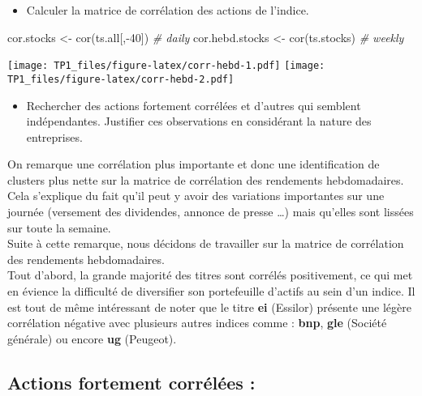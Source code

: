 \documentclass[
]{article}
\newenvironment{Shaded}{\begin{snugshade}}{\end{snugshade}}
\newcommand{\CommentTok}[1]{\textcolor[rgb]{0.56,0.35,0.01}{\textit{#1}}}
\newcommand{\DecValTok}[1]{\textcolor[rgb]{0.00,0.00,0.81}{#1}}
\newcommand{\FunctionTok}[1]{\textcolor[rgb]{0.00,0.00,0.00}{#1}}
\newcommand{\NormalTok}[1]{#1}
\newcommand{\OtherTok}[1]{\textcolor[rgb]{0.56,0.35,0.01}{#1}}
\newcommand{\SpecialCharTok}[1]{\textcolor[rgb]{0.00,0.00,0.00}{#1}}
\providecommand{\tightlist}{%
  \setlength{\itemsep}{0pt}\setlength{\parskip}{0pt}}
\begin{document}
\begin{itemize}
\tightlist
\item
  Calculer la matrice de corrélation des actions de l'indice.
\end{itemize}

\begin{Shaded}
\begin{Highlighting}[]
\NormalTok{cor.stocks }\OtherTok{\textless{}{-}} \FunctionTok{cor}\NormalTok{(ts.all[,}\SpecialCharTok{{-}}\DecValTok{40}\NormalTok{]) }\CommentTok{\# daily}
\NormalTok{cor.hebd.stocks }\OtherTok{\textless{}{-}} \FunctionTok{cor}\NormalTok{(ts.stocks) }\CommentTok{\# weekly}
\end{Highlighting}
\end{Shaded}

\texttt{[image: TP1\_files/figure-latex/corr-hebd-1.pdf]}
\texttt{[image: TP1\_files/figure-latex/corr-hebd-2.pdf]}

\begin{itemize}
\tightlist
\item
  Rechercher des actions fortement corrélées et d'autres qui semblent
  indépendantes. Justifier ces observations en considérant la nature des
  entreprises.
\end{itemize}

On remarque une corrélation plus importante et donc une identification
de clusters plus nette sur la matrice de corrélation des rendements
hebdomadaires. Cela s'explique du fait qu'il peut y avoir des variations
importantes sur une journée (versement des dividendes, annonce de presse
\ldots) mais qu'elles sont lissées sur toute la semaine.\\
Suite à cette remarque, nous décidons de travailler sur la matrice de
corrélation des rendements hebdomadaires.\\
Tout d'abord, la grande majorité des titres sont corrélés positivement,
ce qui met en évience la difficulté de diversifier son portefeuille
d'actifs au sein d'un indice. Il est tout de même intéressant de noter
que le titre \textbf{ei} (Essilor) présente une légère corrélation
négative avec plusieurs autres indices comme : \textbf{bnp},
\textbf{gle} (Société générale) ou encore \textbf{ug} (Peugeot).

\hypertarget{actions-fortement-corruxe9luxe9es}{%
\subsection{Actions fortement corrélées
:}\label{actions-fortement-corruxe9luxe9es}}
\end{document}
